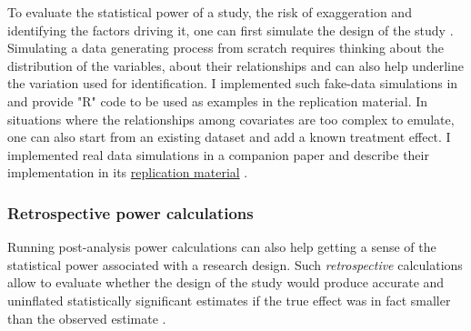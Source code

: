 \documentclass[usletter, 12pt]{article}
\begin{document}
				To evaluate the statistical power of a study, the risk of exaggeration and identifying the factors driving it, one can first simulate the design of the study \citep{hill_bayesian_2011, gelman_regression_2020, black_simulated_2021}. Simulating a data generating process from scratch requires thinking about the distribution of the variables, about their relationships and can also help underline the variation used for identification. %
			 I implemented such fake-data simulations in  and provide "R" code to be used as examples in the replication material. In situations where the relationships among covariates are too complex to emulate, one can also start from an existing dataset and add a known treatment effect. I implemented real data simulations in a companion paper and describe their implementation in its \href{https://vincentbagilet.github.io/inference_pollution/}{replication material} \citep{bagilet_accurately_2023}. 
			 
				
			\subsubsection{Retrospective power calculations}
			
				Running post-analysis power calculations can also help getting a sense of the statistical power associated with a research design. Such \textit{retrospective} calculations allow to evaluate whether the design of the study would produce accurate and uninflated statistically significant estimates if the true effect was in fact smaller than the observed estimate \citep{gelman_beyond_2014, ioannidis_power_2017, stommes_reliability_2021}. 
				
\end{document}

